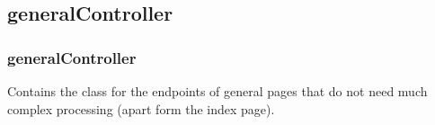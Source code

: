 \documentclass[letterpaper,10pt,english]{manual}
\begin{document}
\subsection{generalController}
\hypertarget{module-webscavator.controllers.generalController}{}
\modulesynopsis{}

\subsubsection{generalController}

Contains the class for the endpoints of general pages that do not need much complex processing
(apart form the index page).
\end{document}
